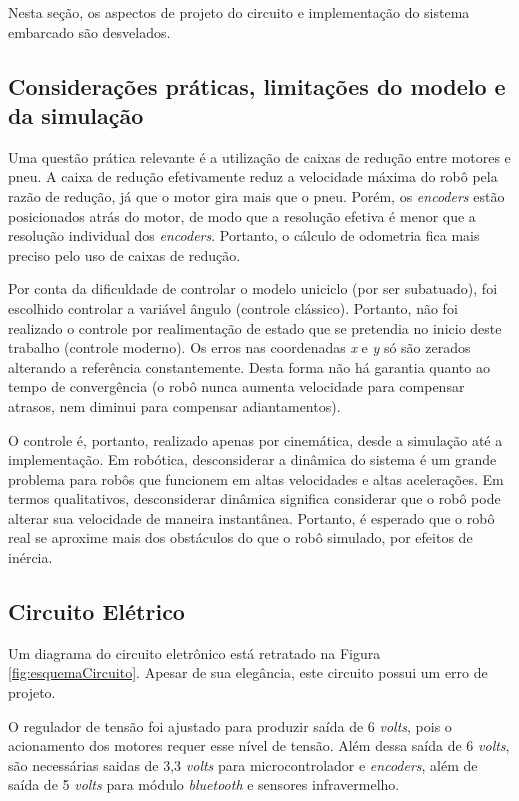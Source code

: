 	Nesta seção, os aspectos de projeto do circuito e implementação do sistema embarcado 
	são desvelados.

	\subsection{Considerações práticas, limitações do modelo e da simulação}
	
	Uma questão prática relevante é a utilização de caixas de redução entre motores e pneu.
	A caixa de redução efetivamente reduz a velocidade máxima do robô pela razão de redução, 
	já que o motor gira mais que o pneu. Porém, os \textit{encoders} estão posicionados atrás 
	do motor, de modo que a resolução efetiva é menor que a resolução individual dos 
	\textit{encoders}. Portanto, o cálculo de odometria fica mais preciso pelo uso de caixas
	de redução.
	
	Por conta da dificuldade de controlar o modelo uniciclo (por ser subatuado), foi escolhido
	controlar a variável ângulo (controle clássico). Portanto, não foi realizado o controle 
	por realimentação de estado que se pretendia no inicio deste trabalho (controle moderno).
	Os erros nas coordenadas \textit{x} e \textit{y} só são zerados alterando a referência
	constantemente. Desta forma não há garantia quanto ao tempo de convergência (o
	robô nunca aumenta velocidade para compensar atrasos, nem diminui para compensar 
	adiantamentos). 
	
	O controle é, portanto, realizado apenas por cinemática, desde a simulação até a
	implementação. Em robótica, desconsiderar a dinâmica do sistema é um grande problema
	para robôs que funcionem em altas velocidades e altas acelerações. Em termos qualitativos,
	desconsiderar dinâmica significa considerar que o robô pode alterar sua velocidade de 
	maneira instantânea. Portanto, é esperado que o robô real se aproxime mais dos
	obstáculos do que o robô simulado, por efeitos de inércia. 

	\subsection{Circuito Elétrico}
	
	Um diagrama do circuito eletrônico está retratado na Figura \ref{fig:esquemaCircuito}. 
	Apesar de sua elegância, este circuito possui um erro de projeto.
	
	
	
	O regulador de tensão foi ajustado para produzir saída de 6 \textit{volts}, pois o 
	acionamento dos motores requer esse nível de tensão. Além dessa saída de 6 \textit{volts}, 
	são necessárias saidas de 3,3 \textit{volts} para microcontrolador e \textit{encoders}, 
	além de saída de 5 \textit{volts} para módulo \textit{bluetooth} e sensores infravermelho. 
	
